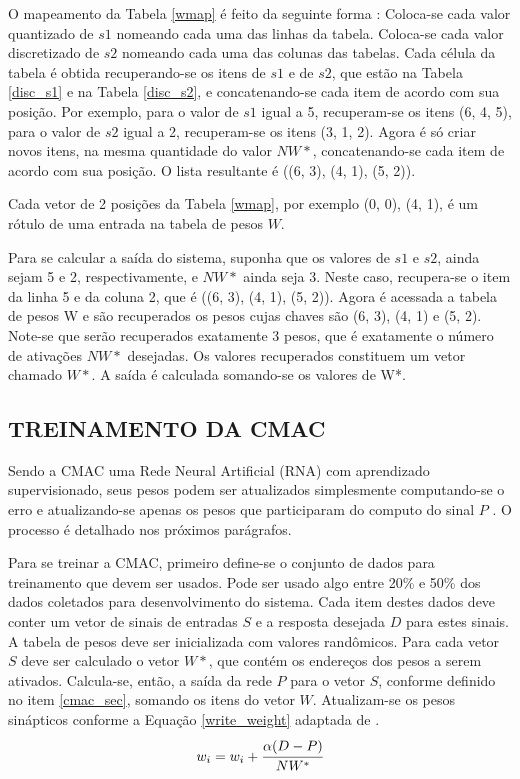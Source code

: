 O mapeamento da Tabela \ref{wmap} é feito da seguinte forma \cite{Albus1975b}: 
Coloca-se cada valor quantizado de $s1$ nomeando cada uma das linhas da tabela. 
Coloca-se cada valor discretizado de $s2$ nomeando cada uma das colunas das tabelas. 
Cada célula da tabela é obtida recuperando-se os itens de $s1$ e de $s2$, que estão na Tabela \ref{disc_s1} e na Tabela \ref{disc_s2}, e concatenando-se cada item de acordo com sua posição. 
Por exemplo, para o valor de $s1$ igual a 5, recuperam-se os itens (6, 4, 5), para o valor de $s2$ igual a 2, recuperam-se os itens (3, 1, 2). 
Agora é só criar novos itens, na mesma quantidade do valor $NW*$, concatenando-se cada item de acordo com sua posição. O lista resultante é ((6, 3), (4, 1), (5, 2)). 

Cada vetor de 2 posições da Tabela \ref{wmap}, por exemplo (0, 0), (4, 1), é um rótulo de uma entrada na tabela de pesos $W$.

Para se calcular a saída do sistema, suponha que os valores de $s1$ e $s2$, ainda sejam 5 e 2, respectivamente, e $NW*$ ainda seja 3. 
Neste caso, recupera-se o item da linha 5 e da coluna 2, que é ((6, 3), (4, 1), (5, 2)). 
Agora é acessada a tabela de pesos W e são recuperados os pesos cujas chaves são (6, 3), (4, 1) e (5, 2). 
Note-se que serão recuperados exatamente 3 pesos, que é exatamente o número de ativações $NW*$ desejadas. 
Os valores recuperados constituem um vetor chamado $W*$. A saída é calculada somando-se os valores de W*.



\subsection{TREINAMENTO DA CMAC}
Sendo a CMAC uma Rede Neural Artificial (RNA) com aprendizado supervisionado, seus pesos podem ser atualizados simplesmente computando-se o erro e atualizando-se apenas os pesos que participaram do computo do sinal $P$ \cite{Haykin1998}. O processo é detalhado nos próximos parágrafos.

Para se treinar a CMAC, primeiro define-se o conjunto de dados para treinamento que devem ser usados. 
Pode ser usado algo entre 20\% e 50\% dos dados coletados para desenvolvimento do sistema. 
Cada item destes dados deve conter um vetor de sinais de entradas $S$ e a resposta desejada $D$ para estes sinais. 
A tabela de pesos deve ser inicializada com valores randômicos. 
Para cada vetor $S$ deve ser calculado o vetor $W*$, que contém os endereços dos pesos a serem ativados. 
Calcula-se, então, a saída da rede $P$ para o vetor $S$, conforme definido no item \ref{cmac_sec}, somando os itens do vetor $W$. 
Atualizam-se os pesos sinápticos conforme a Equação \ref{write_weight} adaptada de .
\begin{equation}
	\label{write_weight}
	w_{i} = w_{i} + \cfrac{\alpha (D - P)}{NW^{*}}
\end{equation}

